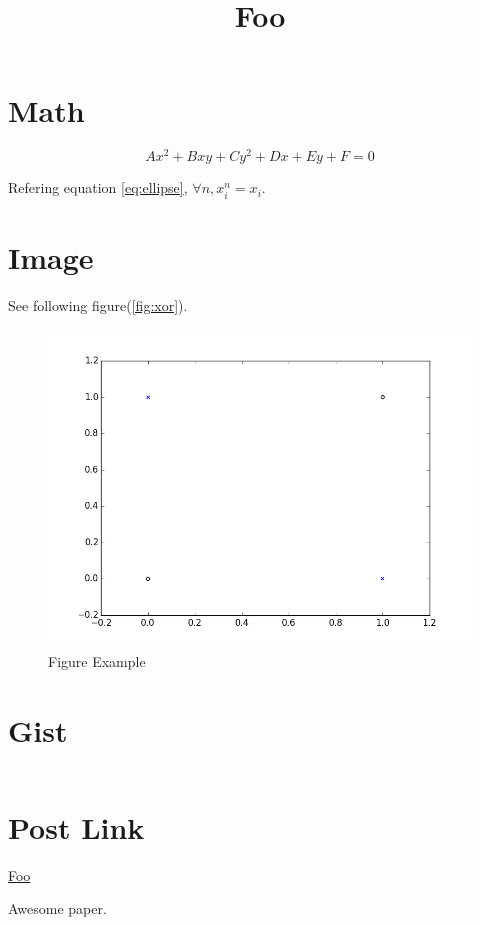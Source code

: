 \documentclass[]{article}
\title{Foo}
\date{}
\begin{document}
\maketitle

\section{Math}\label{math}

\begin{equation}\label{eq:ellipse}
Ax^2 + Bxy + Cy^2 + Dx + Ey + F = 0
\end{equation}

Refering equation \eqref{eq:ellipse}, \(\forall n, x_i^n = x_i\).

\section{Image}\label{image}

See following figure(\autoref{fig:xor}).

\begin{figure}[h]\centering\includegraphics[width=\textwidth]{.//assets/images/xor.png}\caption{Figure Example}\label{fig:xor}\end{figure}

\section{Gist}\label{gist}

\inputminted[mathescape, linenos, frame=lines, framesep=2mm]{Python}{.gist-cache/cache.7aeefc0de1bb10005514355a5c4a5dfe-1c74b8336494cb0e9c6d-xor-5d.py}

\section{Post Link}\label{post-link}

\href{http://localhost:4000/2015/04/29/foo/}{Foo}

Awesome paper\cite{mikolov2013efficient}.





\renewcommand{\thefootnote}{}

\end{document}
